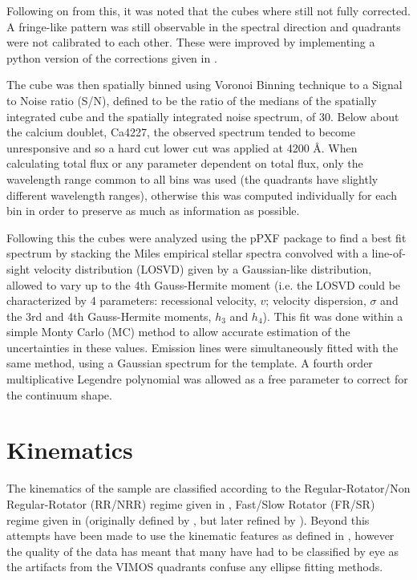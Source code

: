\documentclass[a4paper,fleqn,usenatbib,useAMS]{mnras}
\begin{document}

		Following on from this, it was noted that the cubes where still not fully corrected. A fringe-like pattern was still observable in the spectral direction and quadrants were not calibrated to each other. These were improved by implementing a python version of the corrections given in \citet{Lagerholm2012}. 


		The cube was then spatially binned using Voronoi Binning technique \citep{Cappellari2003} to a Signal to Noise ratio (S/N), defined to be the ratio of the medians of the spatially integrated cube and the spatially integrated noise spectrum, of 30. Below about the calcium doublet, Ca4227, the observed spectrum tended to become unresponsive and so a hard cut lower cut was applied at 4200 \AA. When calculating total flux or any parameter dependent on total flux, only the wavelength range common to all bins was used (the quadrants have slightly different wavelength ranges), otherwise this was computed individually for each bin in order to preserve as much as information as possible.

		Following this the cubes were analyzed using the pPXF package \citep{Cappellari2004} to find a best fit spectrum by stacking the Miles empirical stellar spectra \citep{Sanchez-Blazquez2006} convolved with a line-of-sight velocity distribution (LOSVD) given by a Gaussian-like distribution, allowed to vary up to the 4th Gauss-Hermite moment (i.e. the LOSVD could be characterized by 4 parameters: recessional velocity, $v$; velocity dispersion, $\sigma$ and the 3rd and 4th Gauss-Hermite moments, $h_3$ and $h_4$). This fit was done within a simple Monty Carlo (MC) method to allow accurate estimation of the uncertainties in these values. Emission lines were simultaneously fitted with the same method, using a Gaussian spectrum for the template. A fourth order multiplicative Legendre polynomial was allowed as a free parameter to correct for the continuum shape. 

\section{Kinematics}
	\label{sec:kine}
	The kinematics of the sample are classified according to the Regular-Rotator/Non Regular-Rotator (RR/NRR) regime given in \citet{Krajnovic2011}, Fast/Slow Rotator (FR/SR) regime given in \citet{Cappellari2016} (originally defined by \citet{Emsellem2011}, but later refined by \citet{Cappellari2016}). Beyond this attempts have been made to use the kinematic features as defined in \citet{Krajnovic2011}, however the quality of the data has meant that many have had to be classified by eye as the artifacts from the VIMOS quadrants confuse any ellipse fitting methods. 
\end{document}
